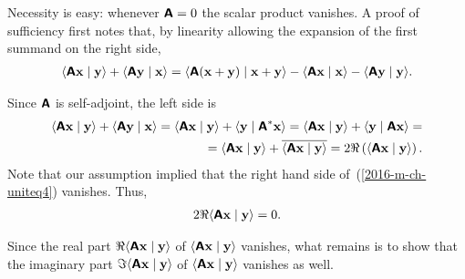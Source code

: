 {Necessity is easy: whenever $\textsf{\textbf{A}} = 0$ the scalar product vanishes.
A proof of sufficiency first notes that, by linearity allowing the expansion of the first summand on the right side,
\begin{equation}
\begin{split}
\langle \textsf{\textbf{A}} {\bf x} \mid {\bf y} \rangle
+
\langle \textsf{\textbf{A}} {\bf y} \mid {\bf x} \rangle
=
\langle \textsf{\textbf{A}} ( {\bf x} +{\bf y} ) \mid {\bf x} + {\bf y} \rangle
-
\langle \textsf{\textbf{A}} {\bf x} \mid {\bf x} \rangle
-
\langle \textsf{\textbf{A}} {\bf y} \mid {\bf y} \rangle
.
\end{split}
\label{2016-m-ch-uniteq4}
\end{equation}

Since $\textsf{\textbf{A}}$ is self-adjoint, the left side is
\begin{equation}
\begin{split}
\langle \textsf{\textbf{A}} {\bf x} \mid {\bf y} \rangle
+
\langle \textsf{\textbf{A}} {\bf y} \mid {\bf x} \rangle
=
\langle \textsf{\textbf{A}} {\bf x} \mid {\bf y} \rangle
+
\langle {\bf y} \mid  \textsf{\textbf{A}}^\ast {\bf x} \rangle
=
\langle \textsf{\textbf{A}} {\bf x} \mid {\bf y} \rangle
+
\langle {\bf y} \mid  \textsf{\textbf{A}} {\bf x} \rangle  =\\
=
\langle \textsf{\textbf{A}} {\bf x} \mid {\bf y} \rangle
+
\overline{ \langle \textsf{\textbf{A}} {\bf x} \mid  {\bf y} \rangle }
= 2 \Re \left( \langle \textsf{\textbf{A}} {\bf x} \mid {\bf y} \rangle      \right)
.
\end{split}
\label{2016-m-ch-uniteq5}
\end{equation}
Note that our assumption implied that the right hand side of~(\ref{2016-m-ch-uniteq4}) vanishes.
Thus, 
\begin{equation}
\begin{split}
2 \Re  \langle \textsf{\textbf{A}} {\bf x} \mid {\bf y} \rangle
=
0
.
\end{split}
\label{2016-m-ch-uniteq6}
\end{equation}

Since the real part
$\Re  \langle \textsf{\textbf{A}} {\bf x} \mid {\bf y} \rangle$
of $ \langle \textsf{\textbf{A}} {\bf x} \mid {\bf y} \rangle$ vanishes,
what remains is to show that the imaginary part
$\Im  \langle \textsf{\textbf{A}} {\bf x} \mid {\bf y} \rangle$
of  $\langle \textsf{\textbf{A}} {\bf x} \mid {\bf y} \rangle$
vanishes as well.

}
